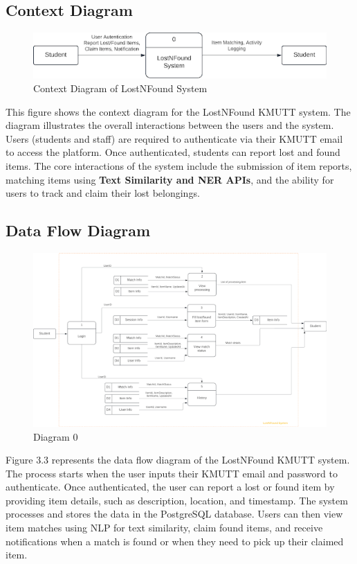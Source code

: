 \subsection{Context Diagram}
\begin{figure}[!h]
    \centering
    \includegraphics[width=1\linewidth]{chapter3/context-diagram.png}
    \caption{Context Diagram of LostNFound System}
    \label{fig:Context Diagram of LostNFound System}
\end{figure}
\par This figure shows the context diagram for the LostNFound KMUTT system. The diagram illustrates the overall interactions between the users and the system. Users (students and staff) are required to authenticate via their KMUTT email to access the platform. Once authenticated, students can report lost and found items. The core interactions of the system include the submission of item reports, matching items using \textbf{Text Similarity and NER APIs}, and the ability for users to track and claim their lost belongings.

\subsection{Data Flow Diagram}
\begin{figure}[!h]
    \centering
    \includegraphics[width=1\linewidth]{chapter3/data-flow-diagram.png}
    \caption{Diagram 0}
    \label{fig:Diagram 0}
\end{figure}
\par
Figure 3.3 represents the data flow diagram of the LostNFound KMUTT system. The process starts when the user inputs their KMUTT email and password to authenticate. Once authenticated, the user can report a lost or found item by providing item details, such as description, location, and timestamp. The system processes and stores the data in the PostgreSQL database. Users can then view item matches using NLP for text similarity, claim found items, and receive notifications when a match is found or when they need to pick up their claimed item.

